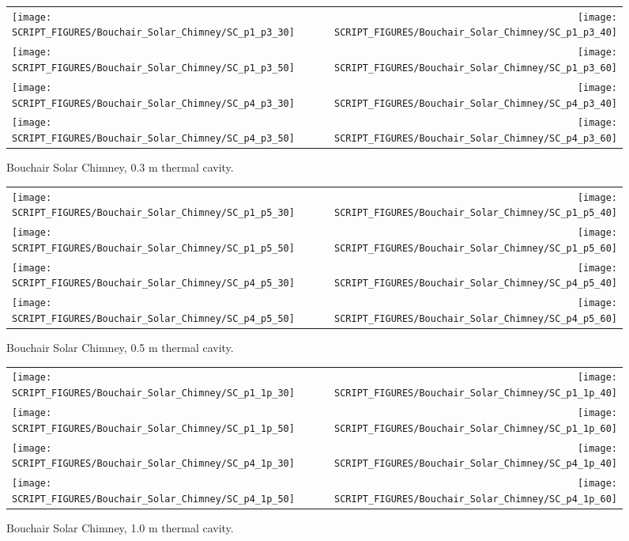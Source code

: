 \begin{figure}[p]
\begin{tabular*}{\textwidth}{l@{\extracolsep{\fill}}r}
\texttt{[image: SCRIPT\_FIGURES/Bouchair\_Solar\_Chimney/SC\_p1\_p3\_30]} &
\texttt{[image: SCRIPT\_FIGURES/Bouchair\_Solar\_Chimney/SC\_p1\_p3\_40]} \\
\texttt{[image: SCRIPT\_FIGURES/Bouchair\_Solar\_Chimney/SC\_p1\_p3\_50]} &
\texttt{[image: SCRIPT\_FIGURES/Bouchair\_Solar\_Chimney/SC\_p1\_p3\_60]} \\
\texttt{[image: SCRIPT\_FIGURES/Bouchair\_Solar\_Chimney/SC\_p4\_p3\_30]} &
\texttt{[image: SCRIPT\_FIGURES/Bouchair\_Solar\_Chimney/SC\_p4\_p3\_40]} \\
\texttt{[image: SCRIPT\_FIGURES/Bouchair\_Solar\_Chimney/SC\_p4\_p3\_50]} &
\texttt{[image: SCRIPT\_FIGURES/Bouchair\_Solar\_Chimney/SC\_p4\_p3\_60]}
\end{tabular*}
\caption{Bouchair Solar Chimney, 0.3 m thermal cavity.}
\label{Bouchair_p3}
\end{figure}

\begin{figure}[p]
\begin{tabular*}{\textwidth}{l@{\extracolsep{\fill}}r}
\texttt{[image: SCRIPT\_FIGURES/Bouchair\_Solar\_Chimney/SC\_p1\_p5\_30]} &
\texttt{[image: SCRIPT\_FIGURES/Bouchair\_Solar\_Chimney/SC\_p1\_p5\_40]} \\
\texttt{[image: SCRIPT\_FIGURES/Bouchair\_Solar\_Chimney/SC\_p1\_p5\_50]} &
\texttt{[image: SCRIPT\_FIGURES/Bouchair\_Solar\_Chimney/SC\_p1\_p5\_60]} \\
\texttt{[image: SCRIPT\_FIGURES/Bouchair\_Solar\_Chimney/SC\_p4\_p5\_30]} &
\texttt{[image: SCRIPT\_FIGURES/Bouchair\_Solar\_Chimney/SC\_p4\_p5\_40]} \\
\texttt{[image: SCRIPT\_FIGURES/Bouchair\_Solar\_Chimney/SC\_p4\_p5\_50]} &
\texttt{[image: SCRIPT\_FIGURES/Bouchair\_Solar\_Chimney/SC\_p4\_p5\_60]}
\end{tabular*}
\caption{Bouchair Solar Chimney, 0.5 m thermal cavity.}
\label{Bouchair_p5}
\end{figure}

\begin{figure}[p]
\begin{tabular*}{\textwidth}{l@{\extracolsep{\fill}}r}
\texttt{[image: SCRIPT\_FIGURES/Bouchair\_Solar\_Chimney/SC\_p1\_1p\_30]} &
\texttt{[image: SCRIPT\_FIGURES/Bouchair\_Solar\_Chimney/SC\_p1\_1p\_40]} \\
\texttt{[image: SCRIPT\_FIGURES/Bouchair\_Solar\_Chimney/SC\_p1\_1p\_50]} &
\texttt{[image: SCRIPT\_FIGURES/Bouchair\_Solar\_Chimney/SC\_p1\_1p\_60]} \\
\texttt{[image: SCRIPT\_FIGURES/Bouchair\_Solar\_Chimney/SC\_p4\_1p\_30]} &
\texttt{[image: SCRIPT\_FIGURES/Bouchair\_Solar\_Chimney/SC\_p4\_1p\_40]} \\
\texttt{[image: SCRIPT\_FIGURES/Bouchair\_Solar\_Chimney/SC\_p4\_1p\_50]} &
\texttt{[image: SCRIPT\_FIGURES/Bouchair\_Solar\_Chimney/SC\_p4\_1p\_60]}
\end{tabular*}
\caption{Bouchair Solar Chimney, 1.0 m thermal cavity.}
\label{Bouchair_1p}
\end{figure}

